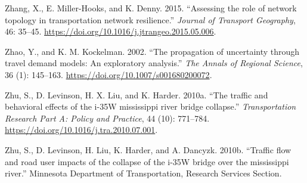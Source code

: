 \documentclass[]{ascelike-new}
\newlength{\cslhangindent}
\newlength{\cslentryspacingunit} %
\newenvironment{CSLReferences}[2] %
 {%
  \setlength{\parindent}{0pt}
  \ifodd #1
  \let\oldpar\par
  \def\par{\hangindent=\cslhangindent\oldpar}
  \fi
  \setlength{\parskip}{#2\cslentryspacingunit}
 }%
 {}
\begin{document}
\begin{CSLReferences}{1}{0}
\leavevmode{}%
Zhang, X., E. Miller-Hooks, and K. Denny. 2015. {``Assessing the role of
network topology in transportation network resilience.''} \emph{Journal
of Transport Geography}, 46: 35--45.
\url{https://doi.org/10.1016/j.jtrangeo.2015.05.006}.

\leavevmode{}%
Zhao, Y., and K. M. Kockelman. 2002. {``The propagation of uncertainty
through travel demand models: An exploratory analysis.''} \emph{The
Annals of Regional Science}, 36 (1): 145--163.
\url{https://doi.org/10.1007/s001680200072}.

\leavevmode{}%
Zhu, S., D. Levinson, H. X. Liu, and K. Harder. 2010a. {``The traffic
and behavioral effects of the i-35W mississippi river bridge
collapse.''} \emph{Transportation Research Part A: Policy and Practice},
44 (10): 771--784. \url{https://doi.org/10.1016/j.tra.2010.07.001}.

\leavevmode{}%
Zhu, S., D. Levinson, H. Liu, K. Harder, and A. Dancyzk. 2010b.
{``Traffic flow and road user impacts of the collapse of the i-35W
bridge over the mississippi river.''} Minnesota Department of
Transportation, Research Services Section.

\end{CSLReferences}
\end{document}
